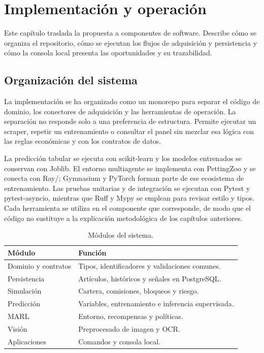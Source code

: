 \chapter{Implementación y operación}

\noindent Este capítulo traslada la propuesta a componentes de software. Describe cómo se organiza el repositorio, cómo se ejecutan los flujos de adquisición y persistencia y cómo la consola local presenta las oportunidades y su trazabilidad.

\section{Organización del sistema}

La implementación se ha organizado como un monorepo para separar el código de dominio, los conectores de adquisición y las herramientas de operación. La separación no responde solo a una preferencia de estructura. Permite ejecutar un scraper, repetir un entrenamiento o consultar el panel sin mezclar esa lógica con las reglas económicas y con los contratos de datos.

La predicción tabular se ejecuta con scikit-learn y los modelos entrenados se conservan con Joblib. El entorno multiagente se implementa con PettingZoo y se conecta con Ray/; Gymnasium y PyTorch forman parte de ese ecosistema de entrenamiento. Las pruebas unitarias y de integración se ejecutan con Pytest y pytest-asyncio, mientras que Ruff y Mypy se emplean para revisar estilo y tipos. Cada herramienta se utiliza en el componente que corresponde, de modo que el código no sustituye a la explicación metodológica de los capítulos anteriores.

\begin{table}[h]
\centering
\begin{tabularx}{\textwidth}{>{\raggedright\arraybackslash}p{} >{\raggedright\arraybackslash}X}
\toprule
Módulo & Función \\
\midrule
Dominio y contratos & Tipos, identificadores y validaciones comunes. \\
Persistencia & Artículos, históricos y señales en PostgreSQL. \\
Simulación & Cartera, comisiones, bloqueos y riesgo. \\
Predicción & Variables, entrenamiento e inferencia supervisada. \\
MARL & Entorno, recompensas y políticas. \\
Visión & Preprocesado de imagen y OCR. \\
Aplicaciones & Comandos y consola local. \\
\bottomrule
\end{tabularx}
\caption{Módulos del sistema.}
\label{tab:modulos-repositorio}
\end{table}

